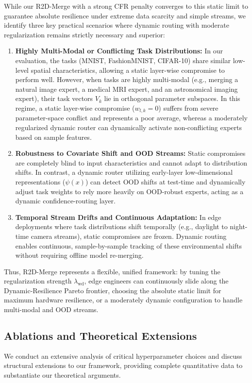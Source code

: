 While our R2D-Merge with a strong CFR penalty converges to this static limit to guarantee absolute resilience under extreme data scarcity and simple streams, we identify three key practical scenarios where dynamic routing with moderate regularization remains strictly necessary and superior:
\begin{enumerate}
    \item \textbf{Highly Multi-Modal or Conflicting Task Distributions:} In our evaluation, the tasks (MNIST, FashionMNIST, CIFAR-10) share similar low-level spatial characteristics, allowing a static layer-wise compromise to perform well. However, when tasks are highly multi-modal (e.g., merging a natural image expert, a medical MRI expert, and an astronomical imaging expert), their task vectors $V_k$ lie in orthogonal parameter subspaces. In this regime, a static layer-wise compromise ($w_{l,k}=0$) suffers from severe parameter-space conflict and represents a poor average, whereas a moderately regularized dynamic router can dynamically activate non-conflicting experts based on sample features.
    \item \textbf{Robustness to Covariate Shift and OOD Streams:} Static compromises are completely blind to input characteristics and cannot adapt to distribution shifts. In contrast, a dynamic router utilizing early-layer low-dimensional representations ($\psi(x)$) can detect OOD shifts at test-time and dynamically adjust task weights to rely more heavily on OOD-robust experts, acting as a dynamic confidence-routing layer.
    \item \textbf{Temporal Stream Drifts and Continuous Adaptation:} In edge deployments where task distributions shift temporally (e.g., daylight to night-time camera streams), static compromises are frozen. Dynamic routing enables continuous, sample-by-sample tracking of these environmental shifts without requiring offline model re-merging.
\end{enumerate}
Thus, R2D-Merge represents a flexible, unified framework: by tuning the regularization strength $\lambda_{\text{wd}}$, edge engineers can continuously slide along the Dynamic-Resilience Pareto frontier, choosing the absolute static limit for maximum hardware resilience, or a moderately dynamic configuration to handle multi-modal and OOD streams.

\subsection{Ablations and Theoretical Extensions}
We conduct an extensive analysis of critical hyperparameter choices and discuss structural extensions to our framework, providing complete quantitative data to substantiate our theoretical arguments.

